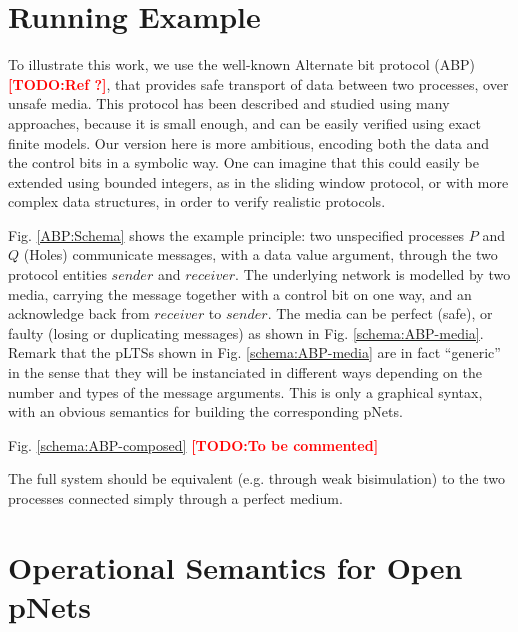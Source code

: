 \documentclass{lncs/llncs}
\newcommand{\TODO}[1]{\textcolor{red}{\textbf{[TODO:#1]}}}
\begin{document}
\section{Running Example}
To illustrate this work, we use the well-known Alternate bit protocol
(ABP) \TODO{Ref ?}, that provides safe transport of data between two processes,
over unsafe media. This protocol has been described and studied using
many approaches, because it is small enough, and can be easily
verified using exact finite models. Our version here is more
ambitious, encoding both the data and the control bits in a symbolic
way. One can imagine that this could easily be extended using bounded
integers, as in the sliding window protocol, or with more complex data
structures, in order to verify realistic protocols.

Fig. \ref{ABP:Schema} shows the example principle: two unspecified
processes $P$ and $Q$ (Holes) communicate messages, with a data value
argument, through the two protocol entities $sender$ and
$receiver$. The underlying network is modelled by two media,
carrying the message together with a control bit on one way, and an
acknowledge back from $receiver$ to $sender$. The media can be perfect (safe), or
faulty (losing or duplicating messages) as shown in
Fig. \ref{schema:ABP-media}. Remark that the pLTSs shown in
Fig. \ref{schema:ABP-media} are in fact ``generic'' in the sense that
they will be instanciated in different ways depending on the number
and types of the message arguments. This is only a graphical syntax,
with an obvious semantics for building the corresponding pNets.

Fig. \ref{schema:ABP-composed} \TODO{To be commented}

The full system should be equivalent (e.g. through weak bisimulation)
to the two processes connected simply through a perfect medium.



\section{Operational Semantics for Open pNets}
\label{section:op-semantics}
\end{document}
